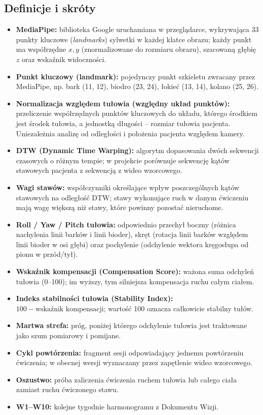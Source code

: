 \documentclass[11pt,a4paper]{article}
\begin{document}
\subsection{Definicje i skróty}
\begin{itemize}
    \item \textbf{MediaPipe:} biblioteka Google uruchamiana w przeglądarce, wykrywająca 33 punkty kluczowe (\textit{landmarks}) sylwetki w każdej klatce obrazu; każdy punkt ma współrzędne $x, y$ (znormalizowane do rozmiaru obrazu), szacowaną głębię $z$ oraz wskaźnik widoczności.
    \item \textbf{Punkt kluczowy (landmark):} pojedynczy punkt szkieletu zwracany przez MediaPipe, np. bark (11, 12), biodro (23, 24), łokieć (13, 14), kolano (25, 26).
    \item \textbf{Normalizacja względem tułowia (względny układ punktów):} przeliczenie współrzędnych punktów kluczowych do układu, którego środkiem jest środek tułowia, a jednostką długości -- rozmiar tułowia pacjenta. Uniezależnia analizę od odległości i położenia pacjenta względem kamery.
    \item \textbf{DTW (Dynamic Time Warping):} algorytm dopasowania dwóch sekwencji czasowych o różnym tempie; w projekcie porównuje sekwencję kątów stawowych pacjenta z sekwencją z wideo wzorcowego.
    \item \textbf{Wagi stawów:} współczynniki określające wpływ poszczególnych kątów stawowych na odległość DTW; stawy wykonujące ruch w danym ćwiczeniu mają wagę większą niż stawy, które powinny pozostać nieruchome.
    \item \textbf{Roll / Yaw / Pitch tułowia:} odpowiednio przechył boczny (różnica nachylenia linii barków i linii bioder), skręt (rotacja linii barków względem linii bioder w osi głębi) oraz pochylenie (odchylenie wektora kręgosłupa od pionu w przód/tył).
    \item \textbf{Wskaźnik kompensacji (Compensation Score):} ważona suma odchyleń tułowia (0--100); im wyższy, tym silniejsza kompensacja ruchu całym ciałem.
    \item \textbf{Indeks stabilności tułowia (Stability Index):} $100 - \text{wskaźnik kompensacji}$; wartość 100 oznacza całkowicie stabilny tułów.
    \item \textbf{Martwa strefa:} próg, poniżej którego odchylenie tułowia jest traktowane jako szum pomiarowy i pomijane.
    \item \textbf{Cykl powtórzenia:} fragment sesji odpowiadający jednemu powtórzeniu ćwiczenia; w obecnej wersji wyznaczany przez zapętlenie wideo wzorcowego.
    \item \textbf{Oszustwo:} próba zaliczenia ćwiczenia ruchem tułowia lub całego ciała zamiast ruchu ćwiczonego stawu.
    \item \textbf{W1--W10:} kolejne tygodnie harmonogramu z Dokumentu Wizji.
\end{itemize}
\end{document}
